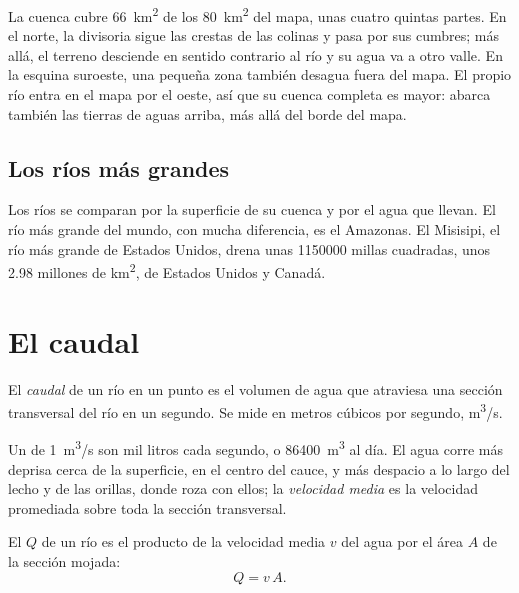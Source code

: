 La cuenca cubre \qty{66}{km^2} de los \qty{80}{km^2} del mapa, unas cuatro
quintas partes. En el norte, la divisoria sigue las crestas de las
colinas y pasa por sus cumbres; más allá, el terreno desciende en sentido contrario al río y su
agua va a otro valle. En la esquina suroeste, una pequeña zona también
desagua fuera del mapa. El propio río entra en el mapa por el oeste, así que
su cuenca completa es mayor: abarca también las tierras de aguas arriba, más
allá del borde del mapa.

\subsection*{Los ríos más grandes}

Los ríos se comparan por la superficie de su cuenca y por el agua que llevan.
El río más grande del mundo, con mucha diferencia, es el Amazonas. El
Misisipi, el río más grande de Estados Unidos, drena unas \num{1150000}
millas cuadradas, unos 2.98 millones de \unit{km^2}, de Estados Unidos y
Canadá.

\section{El caudal}

\begin{definition}[Caudal]\label{def:g10:drainage-basins:discharge}
El \emph{caudal} de un río en un punto es el volumen de agua
que atraviesa una sección transversal del río en un segundo. Se mide en
metros cúbicos por segundo, \unit{m^3/s}.
\end{definition}

Un  de \qty{1}{m^3/s} son mil litros cada segundo, o
\qty{86400}{m^3} al día. El agua corre más deprisa cerca de la superficie, en
el centro del cauce, y más despacio a lo largo del lecho y de las orillas,
donde roza con ellos; la \emph{velocidad media} es la velocidad promediada
sobre toda la sección transversal.

\begin{proposition}\label{prop:g10:drainage-basins:discharge}
El  $Q$ de un río es el producto de la velocidad media $v$ del agua por
el área $A$ de la sección mojada:
\[
Q = v\,A.
\]
\end{proposition}


